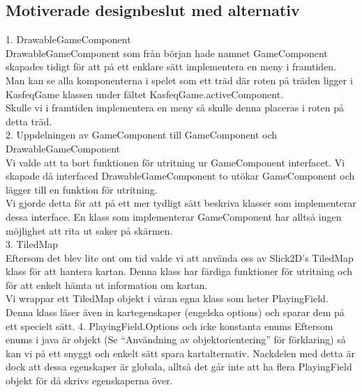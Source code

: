 \subsection{Motiverade designbeslut med alternativ}
1. DrawableGameComponent\\
DrawableGameComponent som från början hade namnet GameComponent skapades tidigt för att på ett enklare sätt implementera en meny i framtiden.\\
Man kan se alla komponenterna i spelet som ett träd där roten på träden ligger i KasfeqGame klassen under fältet KasfeqGame.activeComponent.\\
Skulle vi i framtiden implementera en meny så skulle denna placeras i roten på detta träd.\\
\vspace{11pt}
2. Uppdelningen av GameComponent till GameComponent och DrawableGameComponent\\
Vi valde att ta bort funktionen för utritning ur GameComponent interfacet. Vi skapade då interfaced DrawableGameComponent to utökar GameComponent och lägger till en funktion för utritning.\\
Vi gjorde detta för att på ett mer tydligt sätt beskriva klasser som implementerar dessa interface. En klass som implementerar GameComponent har alltså ingen möjlighet att rita ut saker på skärmen.\\
\vspace{11pt}
3. TiledMap\\
Eftersom det blev lite ont om tid valde vi att använda oss av Slick2D's TiledMap klass för att hantera kartan. Denna klass har färdiga funktioner för utritning och för att enkelt hämta ut information om kartan.\\
Vi wrappar ett TiledMap objekt i våran egna klass som heter PlayingField. Denna klass läser även in kartegenskaper (engelska options) och sparar dem på ett specielt sätt.
\vspace{11pt}
4. PlayingField.Options och icke konstanta enums
Eftersom enums i java är objekt (Se ``Användning av objektorientering'' för förklaring) så kan vi på ett snyggt och enkelt sätt spara kartalternativ. Nackdelen med detta är dock att dessa egenskaper är globala, alltså det går inte att ha flera PlayingField objekt för då skrivs egenskaperna över.
